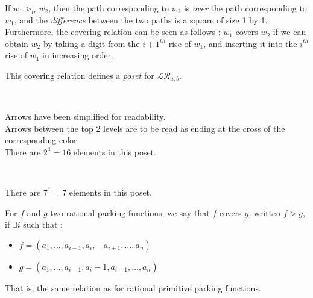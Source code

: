 \begin{rem}
    If $w_1 \gtrdot_{lr} w_2$, then the path corresponding to
    $w_2$ is \emph{over} the path corresponding to $w_1$,
    and the \emph{difference} between the two paths is a
    square of size 1 by 1.\\
    Furthermore, the covering relation can be seen as follows :
    $w_1$ covers $w_2$ if we can obtain $w_2$ by taking a
    digit from the $i + 1^{th}$ rise of $w_1$, and inserting it
    into the $i^{th}$ rise of $w_1$ in increasing order.
\end{rem}

\begin{prop}
    This covering relation defines a \emph{poset}
    for $\mathcal{LR}_{a,b}$.
\end{prop}

\begin{example}
    ~\\
    \begin{center}
        
        Arrows have been simplified for readability.\\
        Arrows between the top 2 levels are to be read
        as ending at the cross of the corresponding color.\\
        There are $2^4 = 16$ elements in this poset.
    \end{center}
\end{example}


\begin{example}
    ~\\
    \begin{center}
        
        There are $7^1 = 7$ elements in this poset.
    \end{center}
\end{example}

\begin{definition}[$\gtrdot$]
    For $f$ and $g$ two rational parking functions, we say
    that $f$ covers $g$, written $f \gtrdot g$, if
    $\exists i$ such that :
    \begin{itemize}
        \item $f = (a_1, \ldots, a_{i-1}, a_i,\ \ \ \ 
            a_{i+1}, \ldots, a_n)$
        \item $g = (a_1, \ldots, a_{i-1}, a_i - 1, a_{i+1},
        \ldots, a_n)$
    \end{itemize}
    That is, the same relation as for rational primitive
    parking functions.
\end{definition}

